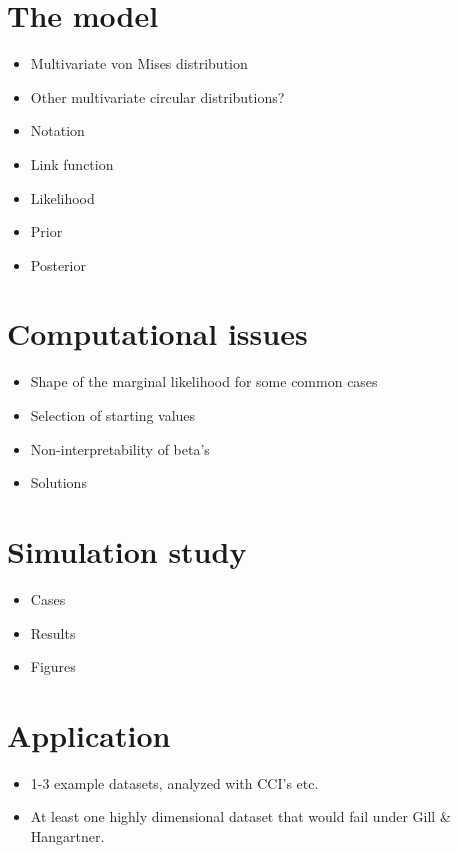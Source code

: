 \documentclass[12pt,a4paper]{article}\usepackage[]{graphicx}\usepackage[]{color}
\begin{document}
\section{The model}

\begin{itemize}
\item Multivariate von Mises distribution
\item Other multivariate circular distributions?
\item Notation
\item Link function
\item Likelihood
\item Prior
\item Posterior
\end{itemize}

\section{Computational issues}

\begin{itemize}
\item Shape of the marginal likelihood for some common cases
\item Selection of starting values
\item Non-interpretability of beta's
\item Solutions
\end{itemize}

\section{Simulation study}

\begin{itemize}
\item Cases
\item Results
\item Figures
\end{itemize}

\section{Application}

\begin{itemize}
\item 1-3 example datasets, analyzed with CCI's etc.
\item At least one highly dimensional dataset that would fail under Gill \& Hangartner.
\end{itemize}
\end{document}
